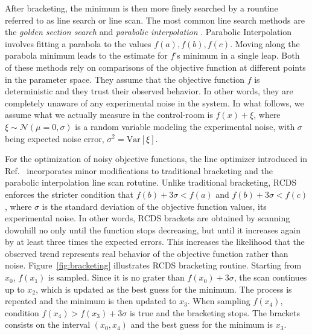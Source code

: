 After bracketing, the minimum is then more finely searched by a rountine referred to as line search or line scan. The most common line search methods are the \textit{golden section search} and \textit{parabolic interpolation} \cite[sections 10.2 and 10.3]{press_numerical_2007}. Parabolic Interpolation involves fitting a parabola to the values $f(a), f(b), f(c)$. Moving along the parabola minimum leads to the estimate for $f$'s minimum in a single leap.
Both of these methods rely on comparisons of the objective function at different points in the parameter space. They assume that the objective function $f$ is deterministic and they trust their observed behavior. In other words, they are completely unaware of any experimental noise in the system. In what follows, we assume what we actually measure in the control-room is $f(x) + \xi$, where $\xi\sim\mathcal{N}(\mu=0, \sigma)$ is a random variable modeling the experimental noise, with $\sigma$ being expected noise error, $\sigma^2 = \text{Var}[\xi]$.

For the optimization of noisy objective functions, the line optimizer introduced in Ref.~\cite{huang_algorithm_2013} incorporates minor modifications to traditional bracketing and the parabolic interpolation line scan rotutine. Unlike traditional bracketing, RCDS enforces the stricter condition that $f(b) + 3\sigma < f(a)$ and $f(b) + 3\sigma < f(c)$, where $\sigma$ is the standard deviation of the objective function values, its experimental noise. In other words, RCDS brackets are obtained by scanning downhill no only until the function stops decreasing, but until it increases again by at least three times the expected errors. This increases the likelihood that the observed trend represents real behavior of the objective function rather than noise. Figure~\ref{fig:bracketing} illustrates RCDS bracketing routine. Starting from $x_0$, $f(x_1)$ is sampled. Since it is no grater than $f(x_0)+3\sigma$, the scan continues up to $x_2$, which is updated as the best guess for the minimum. The process is repeated and the minimum is then updated to $x_3$. When sampling $f(x_4)$, condition $f(x_4) > f(x_3) + 3\sigma$ is true and the bracketing stops. The brackets consists on the interval $(x_0, x_4)$ and the best guess for the minimum is $x_3$.

